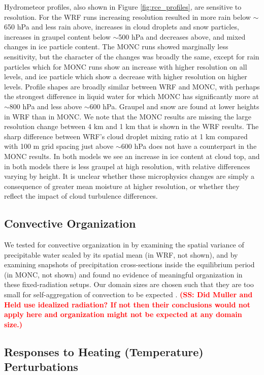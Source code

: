 \documentclass[draft]{agujournal2019}
\newcommand{\todo}[1]{\textcolor{red}{\textbf{(#1)}}}
\begin{document}
Hydrometeor profiles, also shown in Figure \ref{fig:rce_profiles}, are sensitive
to resolution. For the WRF runs increasing resolution resulted in more rain
below $\sim$650 hPa and less rain above, increases in cloud droplets and snow
particles, increases in graupel content below $\sim$500 hPa and decreases above,
and mixed changes in ice particle content. The MONC runs showed marginally less
sensitivity, but the character of the changes was broadly the same, except for
rain particles which for MONC runs show an increase with higher resolution on
all levels, and ice particle which show a decrease with higher resolution on
higher levels. Profile shapes are broadly similar between WRF and MONC, with
perhaps the strongest difference in liquid water for which MONC has
significantly more at $\sim$800 hPa and less above $\sim$600 hPa. Graupel and
snow are found at lower heights in WRF than in MONC. We note that the MONC
results are missing the large resolution change between 4 km and 1 km that is
shown in the WRF results. The sharp difference between WRF's cloud droplet
mixing ratio at 1 km compared with 100 m grid spacing just above $\sim$600 hPa
does not have a counterpart in the MONC results. In both models we see an
increase in ice content at cloud top, and in both models there is less graupel
at high resolution, with relative differences varying by height. It is unclear
whether these microphysics changes are simply a consequence of greater mean
moisture at higher resolution, or whether they reflect the impact of cloud
turbulence differences.

\subsection{Convective Organization}

We tested for convective organization in by examining the spatial variance of
precipitable water scaled by its spatial mean (in WRF, not shown), and by
examining snapshots of precipitation cross-sections inside the equilibrium
period (in MONC, not shown) and found no evidence of meaningful organization in
these fixed-radiation setups. Our domain sizes are chosen such that they are too
small for self-aggregation of convection to be expected \cite{Muller_JAS_2012}.
\todo{SS: Did Muller and Held use idealized radiation?  If not then their
conclusions would not apply here and organization might not be expected at any
domain size.}

\subsection{Responses to Heating (Temperature) Perturbations}
\end{document}

